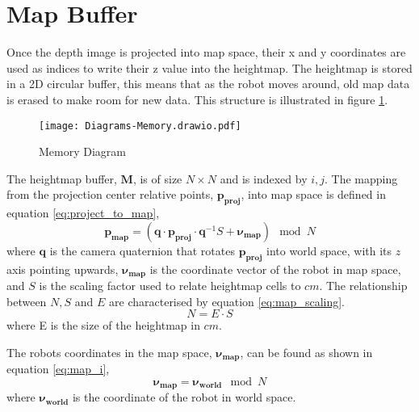 \newpage
\section{Map Buffer}
    Once the depth image is projected into map space, their x and y coordinates are used as indices to write their z value into the heightmap. The heightmap is stored in
    a 2D circular buffer, this means that as the robot moves around, old map data is erased to make room for new data. This structure is illustrated in figure \ref{fig:memory}.
    \begin{figure}[h]
        \centering
        \texttt{[image: Diagrams-Memory.drawio.pdf]}
        \caption{Memory Diagram}
        \label{fig:memory}
    \end{figure}

    The heightmap buffer, \(\boldsymbol{M}\), is of size \(N \times N\) and is indexed by \(i,j\). The mapping from the projection center relative points, \(\boldsymbol{p_{proj}}\), into map space
    is defined in equation \ref{eq:project_to_map},
    \begin{equation} \label{eq:project_to_map}
        \boldsymbol{p_{map}} = (\boldsymbol{q} \cdot \boldsymbol{p_{proj}} \cdot \boldsymbol{q}^{-1}S + \boldsymbol{\nu_{map}}) \mod N
    \end{equation}
    where \(\boldsymbol{q}\) is the camera quaternion that rotates \(\boldsymbol{p_{proj}}\) into world space, with its \(z\) axis pointing upwards, \(\boldsymbol{\nu_{map}}\) 
    is the coordinate vector of the robot in map space, and \(S\) is the scaling factor
    used to relate heightmap cells to \(cm\). The relationship between \(N, S\) and \(E\) are characterised by equation \ref{eq:map_scaling}.
    \begin{equation} \label{eq:map_scaling}
        N = E \cdot S
    \end{equation}
    where E is the size of the heightmap in \(cm\).

    The robots coordinates in the map space, \(\boldsymbol{\nu_{map}}\), can be found as shown in equation \ref{eq:map_i},
    \begin{equation} \label{eq:map_i}
        \boldsymbol{\nu_{map}} = \boldsymbol{\nu_{world}} \mod N
    \end{equation}
    where \(\boldsymbol{\nu_{world}}\) is the coordinate of the robot in world space.

